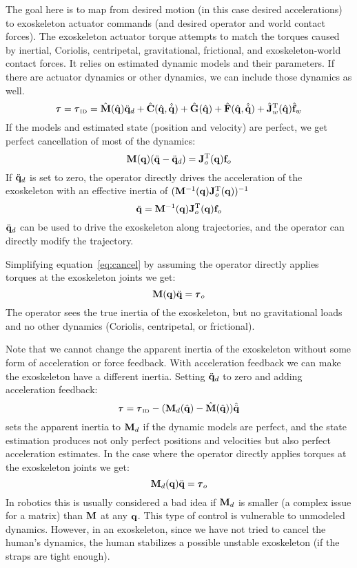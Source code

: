\documentclass[letterpaper,12pt,fullpage]{article}
\newcommand{\invdyn}{{\mbox {\tiny ID}}}
\begin{document}
The goal here is to map from desired motion (in this case desired
accelerations) to exoskeleton actuator commands (and desired operator
and world contact forces).
The exoskeleton actuator torque 
attempts to match the torques caused by inertial, Coriolis, centripetal,
gravitational, frictional, and exoskeleton-world contact forces.
It relies on estimated dynamic models and their parameters.
If there are actuator dynamics or other dynamics, we can include those
dynamics as well.
\begin{equation}
\vtau = \vtau_{\invdyn} 
= \hat{\mM}(\hat{\vq}) \ddot{\vq}_d
+ \hat{\mC}(\hat{\vq},\hat{\dot{\vq}})
+ \hat{\mG}(\hat{\vq})
+ \hat{\mF}(\hat{\vq},\hat{\dot{\vq}})
+ \hat{\mJ}_w^{\tr}(\hat{\vq}) \hat{\vf}_w
\end{equation}
If the models and estimated state (position and velocity) are perfect, we get
perfect cancellation of most of the dynamics:
\begin{equation}
{\bf M}({\bf q}) (\ddot{{\bf q}} - \ddot{{\bf q}}_d) = {\bf J}_o^{{\rm T}}({\bf q}) {\bf f}_o
\end{equation}
If $\ddot{{\bf q}}_d$ is set to zero, the operator directly drives the acceleration
of the exoskeleton with an effective inertia of $({\bf M}^{-1}({\bf q}) {\bf J}_o^{{\rm T}}({\bf q}))^{-1}$
\begin{equation}
\ddot{{\bf q}} = {\bf M}^{-1}({\bf q}) {\bf J}_o^{{\rm T}}({\bf q}) {\bf f}_o
\label{eq:cancel}
\end{equation}
$\ddot{{\bf q}}_d$ can be used to drive the exoskeleton along trajectories, and
the operator can directly modify the trajectory.

Simplifying equation~\ref{eq:cancel} by 
assuming the operator directly applies torques at the
exoskeleton joints we get:
\begin{equation}
\mM (\vq) \ddot{\vq} = \vtau_o
\end{equation}
The operator sees the true inertia of the exoskeleton, but no gravitational
loads and no other dynamics (Coriolis, centripetal, or frictional).

Note that we cannot change the apparent inertia of the exoskeleton without
some form of acceleration or force feedback.
With acceleration feedback we can make the exoskeleton have a different inertia.
Setting $\ddot{{\bf q}}_d$ to zero and adding acceleration feedback:
\begin{equation}
\vtau = \vtau_{\invdyn} - (\mM_d(\hat{\vq}) - \hat{\mM}(\hat{\vq})) \hat{\ddot{\vq}}
\label{eq:change-inertia1}
\end{equation}
sets the apparent inertia to ${\bf M}_d$ if the dynamic models are perfect, and
the state estimation produces not only perfect positions and velocities but
also perfect acceleration estimates. In the case 
where the operator directly applies torques at the
exoskeleton joints we get:
\begin{equation}
\mM_d (\vq) \ddot{\vq} = \vtau_o
\end{equation}
In robotics this is usually considered a bad idea if ${\bf M}_d$ is smaller (a complex
issue for a matrix) than ${\bf M}$ at any ${\bf q}$. This type of control is vulnerable
to unmodeled dynamics. However, in an exoskeleton, since we have not tried to
cancel the human's dynamics, the human stabilizes a possible unstable exoskeleton
(if the straps are tight enough).
\end{document}
